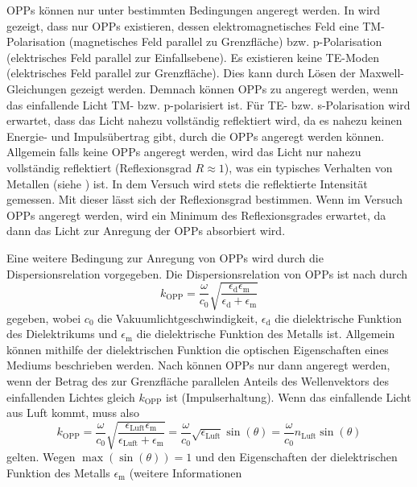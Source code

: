 OPPs können nur unter bestimmten Bedingungen angeregt werden. In \cite{nano} wird gezeigt, dass nur OPPs existieren, dessen elektromagnetisches Feld eine TM-Polarisation (magnetisches Feld
parallel zu Grenzfläche) bzw. p-Polarisation (elektrisches Feld parallel zur Einfallsebene). Es existieren keine TE-Moden (elektrisches Feld parallel zur Grenzfläche).
Dies kann durch Lösen der Maxwell-Gleichungen gezeigt werden. Demnach können OPPs zu angeregt werden, wenn das einfallende Licht TM- bzw. p-polarisiert ist. Für
TE- bzw. s-Polarisation wird erwartet, dass das Licht nahezu vollständig reflektiert wird, da es nahezu keinen Energie- und Impulsübertrag gibt, durch die OPPs
angeregt werden können. Allgemein falls keine OPPs angeregt werden, wird das Licht nur nahezu vollständig reflektiert (Reflexionsgrad $R \approx 1$), was ein typisches
Verhalten von Metallen (siehe \cite{linden_optik}) ist. In dem Versuch wird stets die reflektierte Intensität gemessen. Mit dieser lässt sich der Reflexionsgrad bestimmen.
Wenn im Versuch OPPs angeregt werden, wird ein Minimum des Reflexionsgrades erwartet, da dann das Licht zur Anregung der OPPs absorbiert wird.\par
Eine weitere Bedingung zur Anregung von OPPs wird durch die Dispersionsrelation vorgegeben. Die Dispersionsrelation von OPPs ist nach \cite{linden_optik} durch
\begin{equation*}\label{eq:k_spp}
    k_{\mathrm{OPP}} = \frac{\omega}{c_0} \sqrt{\frac{\epsilon_{\mathrm{d}}\epsilon_{\mathrm{m}}}{\epsilon_{\mathrm{d}} + \epsilon_{\mathrm{m}}}}
\end{equation*} gegeben, wobei $c_0$ die Vakuumlichtgeschwindigkeit, $\epsilon_{\mathrm{d}}$ die dielektrische Funktion des Dielektrikums und $\epsilon_{\mathrm{m}}$
die dielektrische Funktion des Metalls ist. Allgemein können mithilfe der dielektrischen Funktion die optischen Eigenschaften eines Mediums beschrieben werden.
Nach \cite{linden_photonics} können OPPs nur dann angeregt werden, wenn der Betrag des zur Grenzfläche parallelen Anteils des Wellenvektors des einfallenden Lichtes
gleich $k_{\mathrm{OPP}}$ ist (Impulserhaltung). Wenn das einfallende Licht aus Luft kommt, muss also
\begin{equation*}
    k_{\mathrm{OPP}} = \frac{\omega}{c_0}\sqrt{\frac{\epsilon_{\mathrm{Luft}}\epsilon_{\mathrm{m}}}{\epsilon_{\mathrm{Luft}} + \epsilon_{\mathrm{m}}}} = \frac{\omega}{c_0}\sqrt{\epsilon_{\mathrm{Luft}}} \sin(\theta) = \frac{\omega}{c_0}n_{\mathrm{Luft}} \sin(\theta)
\end{equation*} gelten. Wegen $\max(\sin(\theta)) = 1$ und den Eigenschaften der dielektrischen Funktion des Metalls $\epsilon_{\mathrm{m}}$ (weitere Informationen
